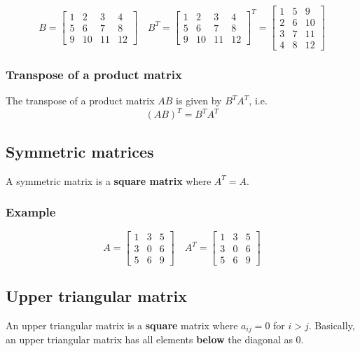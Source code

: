 \documentclass[11pt]{article}
\begin{document}
\begin{displaymath}
B = \begin{bmatrix}
1 & 2 & 3 & 4 \\
5 & 6 & 7 & 8 \\
9 & 10 & 11 & 12
\end{bmatrix} \quad B^{T} = \begin{bmatrix}
1 & 2 & 3 & 4 \\
5 & 6 & 7 & 8 \\
9 & 10 & 11 & 12
\end{bmatrix}^{T} = \begin{bmatrix}
1 & 5 & 9 \\
2 & 6 & 10 \\
3 & 7 & 11 \\
4 & 8 & 12
\end{bmatrix}
\end{displaymath}

\subsubsection{Transpose of a product matrix}
\label{sec:org6ab18b3}
The transpose of a product matrix \(AB\) is given by \(B^T A^T\), i.e.
\[(AB)^T = B^T A^T\]

\subsection{Symmetric matrices}
\label{sec:orga295955}
A symmetric matrix is a \textbf{square matrix} where \(A^T = A\).

\subsubsection{Example}
\label{sec:org1c856af}
\begin{displaymath}
A = \begin{bmatrix}
1 & 3 & 5 \\
3 & 0 & 6 \\
5 & 6 & 9
\end{bmatrix} \quad A^T = \begin{bmatrix}
1 & 3 & 5 \\
3 & 0 & 6 \\
5 & 6 & 9
\end{bmatrix}
\end{displaymath}

\subsection{Upper triangular matrix}
\label{sec:orgac5ee0d}
An upper triangular matrix is a \textbf{square} matrix where \(a_{ij} = 0\) for \(i > j\). Basically, an upper triangular matrix has all elements \textbf{below} the diagonal as 0.
\end{document}
